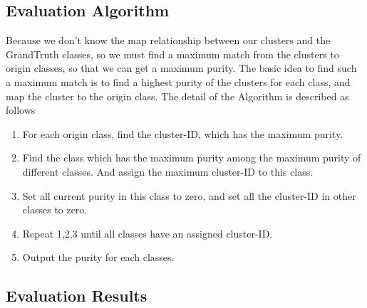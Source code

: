 \documentclass[a4paper,11pt]{article}
\begin{document}
\subsection{Evaluation Algorithm}
Because we don't know the map relationship between our clusters and the GrandTruth classes, so we must find a maximum match from the clusters to origin classes, so that we can get a maximum purity.
The basic idea to find such a maximum match is to find a highest purity of the clusters for each class, and map the cluster to the origin class.
The detail of the Algorithm is described as follows
\begin{enumerate}
  \item For each origin class, find the cluster-ID, which has the maximum purity.  	
  \item Find the class which has the maximum purity among the maximum purity of different classes. And assign the maximum cluster-ID to this class.
  \item Set all current purity in this class to zero, and set all the cluster-ID in other classes to zero.
  \item Repeat 1,2,3 until all classes have an assigned cluster-ID.
  \item Output the purity for each classes.
\end{enumerate}
\subsection{Evaluation Results}



\end{document}
